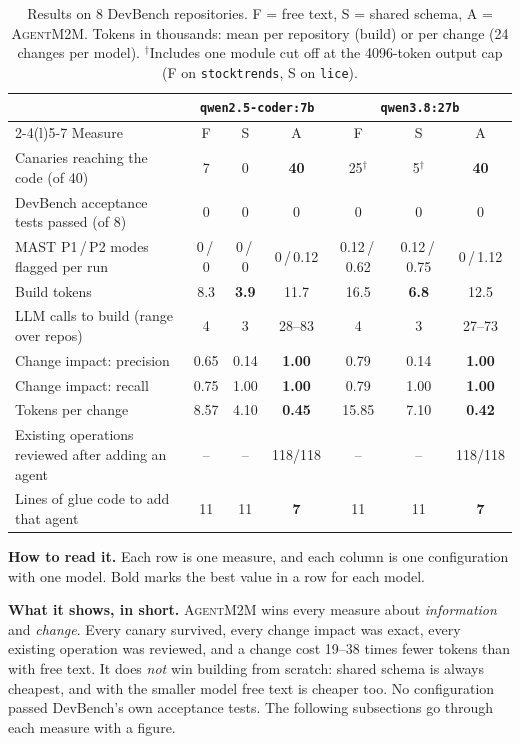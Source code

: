 \documentclass[10pt,a4paper]{article}
\newcommand{\tool}{\textsc{AgentM2M}}
\theoremstyle{definition}
\begin{document}
\begin{table}[!htbp]
\centering\small
\caption{Results on 8 DevBench repositories. F = free text, S = shared
schema, A = \tool{}. Tokens in thousands: mean per repository (build) or per
change (24 changes per model). $^\dagger$Includes one module cut off at the
4096-token output cap (F on \texttt{stocktrends}, S on \texttt{lice}).}
\label{tab:final}
\begin{tabular}{@{}l ccc ccc@{}}
\toprule
& \multicolumn{3}{c}{\texttt{qwen2.5-coder:7b}} & \multicolumn{3}{c}{\texttt{qwen3.8:27b}} \\
\cmidrule(lr){2-4}\cmidrule(l){5-7}
Measure & F & S & A & F & S & A \\
\midrule
Canaries reaching the code (of 40) & 7 & 0 & \textbf{40} & 25$^\dagger$ & 5$^\dagger$ & \textbf{40} \\
DevBench acceptance tests passed (of 8) & 0 & 0 & 0 & 0 & 0 & 0 \\
MAST P1\,/\,P2 modes flagged per run & 0\,/\,0 & 0\,/\,0 & 0\,/\,0.12 & 0.12\,/\,0.62 & 0.12\,/\,0.75 & 0\,/\,1.12 \\
Build tokens & 8.3 & \textbf{3.9} & 11.7 & 16.5 & \textbf{6.8} & 12.5 \\
LLM calls to build (range over repos) & 4 & 3 & 28--83 & 4 & 3 & 27--73 \\
\midrule
Change impact: precision & 0.65 & 0.14 & \textbf{1.00} & 0.79 & 0.14 & \textbf{1.00} \\
Change impact: recall & 0.75 & 1.00 & \textbf{1.00} & 0.79 & 1.00 & \textbf{1.00} \\
Tokens per change & 8.57 & 4.10 & \textbf{0.45} & 15.85 & 7.10 & \textbf{0.42} \\
\midrule
Existing operations reviewed after adding an agent & -- & -- & 118/118 & -- & -- & 118/118 \\
Lines of glue code to add that agent & 11 & 11 & \textbf{7} & 11 & 11 & \textbf{7} \\
\bottomrule
\end{tabular}
\end{table}

\noindent\textbf{How to read it.} Each row is one measure, and each column
is one configuration with one model. Bold marks the best value in a row for
each model.

\noindent\textbf{What it shows, in short.} \tool{} wins every measure about
\emph{information} and \emph{change}. Every canary survived, every change
impact was exact, every existing operation was reviewed, and a change cost
19--38 times fewer tokens than with free text. It does \emph{not} win
building from scratch: shared schema is always cheapest, and with the
smaller model free text is cheaper too. No configuration passed DevBench's
own acceptance tests. The following subsections go through each measure with
a figure.
\end{document}
